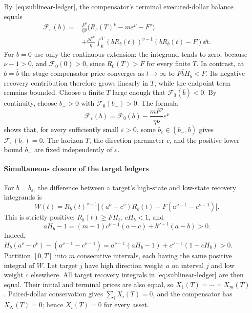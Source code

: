 \documentclass[review,hidelinks,onefignum,onetabnum]{siamonline250211}
\begin{document}
By~\eqref{eq:sublinear-ledger}, the compensator's
terminal executed-dollar balance equals
\[
\begin{aligned}
\mathcal F_\varepsilon(b)
={}&\frac{F^p}{\eta\nu}
\bigl(R_b(T)^\nu-m\varepsilon^\nu-F^\nu\bigr)\\
&+\frac{\rho F^p}{\eta}\int_0^T
(bR_b(t))^{\nu-1}(bR_b(t)-F)\dd t.
\end{aligned}
\]
For $b=0$ use only the continuous extension:
the integrand tends to zero, because $\nu-1>0$,
and $\mathcal F_0(0)>0$, since
$R_0(T)>F$ for every finite $T$. In contrast,
at $b=\bar b$ the stage compensator price
converges as $t\to\infty$ to
$F\bar bH_{\bar b}<F$.
Its negative recovery contribution therefore
grows linearly in $T$, while the endpoint
term remains bounded. Choose a finite $T$
large enough that $\mathcal F_0(\bar b)<0$.
By continuity, choose $b_->0$ with
$\mathcal F_0(b_-)>0$.
The formula
\[
\mathcal F_\varepsilon(b)
=\mathcal F_0(b)-\frac{mF^p}{\eta\nu}\varepsilon^\nu
\]
shows that, for every sufficiently small
$\varepsilon>0$, some
$b_\varepsilon\in(b_-,\bar b)$ gives
$\mathcal F_\varepsilon(b_\varepsilon)=0$.
The horizon $T$, the direction parameter $c$,
and the positive lower bound $b_-$ are fixed
independently of $\varepsilon$.

\paragraph{Simultaneous closure of the target ledgers}
For $b=b_\varepsilon$, the difference between
a target's high-state and low-state recovery
integrands is
\[
W(t)=R_b(t)^{\nu-1}
\Big[(a^\nu-c^\nu)R_b(t)
-F(a^{\nu-1}-c^{\nu-1})\Big].
\]
This is strictly positive: $R_b(t)\ge FH_b$,
$cH_b<1$, and
\[
aH_b-1=(m-1)c^{\nu-1}(a-c)
+b^{\nu-1}(a-b)>0.
\]
Indeed,
$H_b(a^\nu-c^\nu)-(a^{\nu-1}-c^{\nu-1})
=a^{\nu-1}(aH_b-1)+c^{\nu-1}(1-cH_b)>0$.
Partition $[0,T]$ into $m$ consecutive intervals,
each having the same positive integral of $W$.
Let target $j$ have high direction weight $a$
on interval $j$ and low weight $c$ elsewhere.
All target recovery integrals in
\eqref{eq:sublinear-ledger} are then equal.
Their initial and terminal prices are also equal,
so $X_1(T)=\cdots=X_m(T)$. Paired-dollar
conservation gives $\sum_iX_i(T)=0$, and
the compensator has $X_N(T)=0$; hence
$X_i(T)=0$ for every asset.
\end{document}
